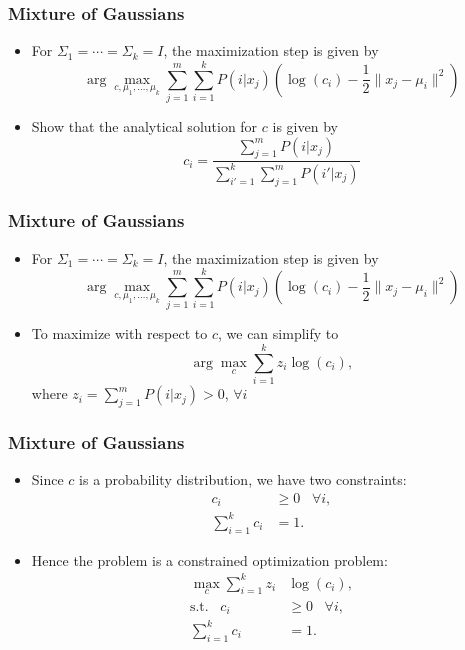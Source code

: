 \documentclass[10pt]{beamer}
\begin{document}
\begin{frame}
  \frametitle{Mixture of Gaussians}
  \begin{itemize}
    \item For $\Sigma_1=\cdots=\Sigma_k=I$, the maximization step is given by
	\[\arg \max_{c,\mu_1,\ldots,\mu_k} \sum_{j=1}^m \sum_{i=1}^k P(i|x_j) \left( \log(c_i) - \frac 1 2 \lVert x_j - \mu_i \rVert^2 \right)\]
	\item Show that the analytical solution for $c$ is given by
	\[c_i = \frac {\sum_{j=1}^m P(i|x_j)} {\sum_{i'=1}^k \sum_{j=1}^m P(i'|x_j)}\]
  \end{itemize}
\end{frame}

\begin{frame}
  \frametitle{Mixture of Gaussians}
  \begin{itemize}
    \item For $\Sigma_1=\cdots=\Sigma_k=I$, the maximization step is given by
	\[\arg \max_{c,\mu_1,\ldots,\mu_k} \sum_{j=1}^m \sum_{i=1}^k P(i|x_j) \left( \log(c_i) - \frac 1 2 \lVert x_j - \mu_i \rVert^2 \right)\]
	\item To maximize with respect to $c$, we can simplify to
	\[\arg \max_c \sum_{i=1}^k z_i \log(c_i),\]
	where $z_i = \sum_{j=1}^m P(i|x_j) > 0$, $\forall i$
  \end{itemize}
\end{frame}

\begin{frame}
  \frametitle{Mixture of Gaussians}
  \begin{itemize}
    \item Since $c$ is a probability distribution, we have two constraints:
	\begin{align*}
	c_i &\geq 0 \;\;\; \forall i,\\
	\sum_{i=1}^k c_i &= 1.
	\end{align*}
	\item Hence the problem is a constrained optimization problem:
	\begin{align*}
	\max_c \sum_{i=1}^k z_i & \log(c_i),\\
	\text{s.t.} \;\;\; c_i &\geq 0 \;\;\; \forall i,\\
	\sum_{i=1}^k c_i &= 1.
	\end{align*}
  \end{itemize}
\end{frame}
\end{document}
